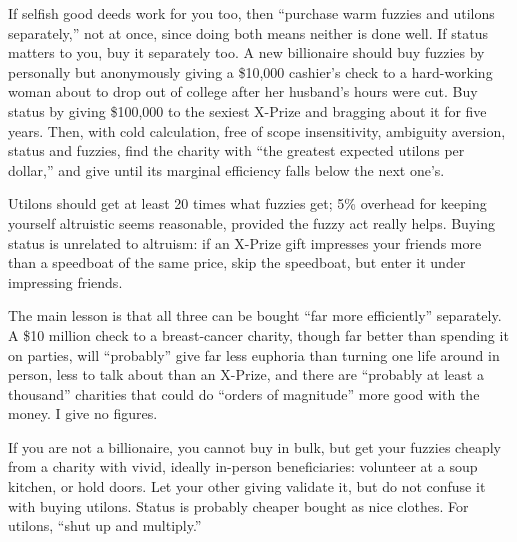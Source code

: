 If selfish good deeds work for you too, then ``purchase warm fuzzies and utilons separately,'' not at once, since doing both means neither is done well. If status matters to you, buy it separately too.  A new billionaire should buy fuzzies by personally but anonymously giving a \$10,000 cashier's check to a hard-working woman about to drop out of college after her husband's hours were cut. Buy status by giving \$100,000 to the sexiest X-Prize and bragging about it for five years. Then, with cold calculation, free of scope insensitivity, ambiguity aversion, status and fuzzies, find the charity with ``the greatest expected utilons per dollar,'' and give until its marginal efficiency falls below the next one's. 

Utilons should get at least 20 times what fuzzies get; 5\% overhead for keeping yourself altruistic seems reasonable, provided the fuzzy act really helps. Buying status is unrelated to altruism: if an X-Prize gift impresses your friends more than a speedboat of the same price, skip the speedboat, but enter it under impressing friends.

The main lesson is that all three can be bought ``far more efficiently'' separately. A \$10 million check to a breast-cancer charity, though far better than spending it on parties, will ``probably'' give far less euphoria than turning one life around in person, less to talk about than an X-Prize, and there are ``probably at least a thousand'' charities that could do ``orders of magnitude'' more good with the money. I give no figures.

If you are not a billionaire, you cannot buy in bulk, but get your fuzzies cheaply from a charity with vivid, ideally in-person beneficiaries: volunteer at a soup kitchen, or hold doors. Let your other giving validate it, but do not confuse it with buying utilons. Status is probably cheaper bought as nice clothes. For utilons, ``shut up and multiply.''
